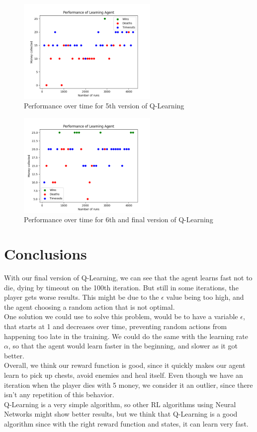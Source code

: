 \documentclass{article}
\begin{document}
  \begin{figure}[h!]
    \centering
    \includegraphics[width=0.6\textwidth]{graph2.png}
    \caption{Performance over time for 5th version of Q-Learning}
    \label{fig:graph}
  \end{figure}
  \noindent
  \begin{figure}[h!]
    \centering
    \includegraphics[width=0.6\textwidth]{graph.png}
    \caption{Performance over time for 6th and final version of Q-Learning}
    \label{fig:graph2}
  \end{figure}

  \newpage

  \section{Conclusions}
  With our final version of Q-Learning, we can see that the agent learns fast not to die, dying by timeout on the 100th iteration.
  But still in some iterations, the player gets worse results. This might be due to the $\epsilon$ value being too high, and the agent 
  choosing a random action that is not optimal.\\
  One solution we could use to solve this problem, would be to have a variable $\epsilon$, that starts at 1 and decreases over time, preventing random actions 
  from happening too late in the training. We could do the same with the learning rate $\alpha$, so that the agent would learn faster in the beginning, and slower
  as it got better.\\
  Overall, we think our reward function is good, since it quickly makes our agent learn to pick up chests, avoid enemies and heal itself.
  Even though we have an iteration when the player dies with 5 money, we consider it an outlier, since there isn't any repetition of this behavior.\\
  Q-Learning is a very simple algorithm, so other RL algorithms using Neural Networks might show better results, but we think that Q-Learning is a good algorithm 
  since with the right reward function and states, it can learn very fast.\\
\end{document}
